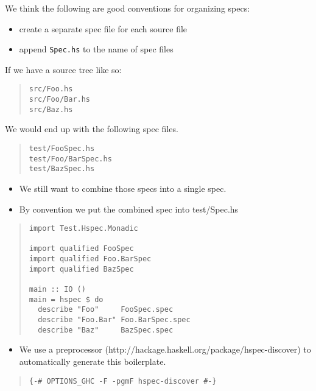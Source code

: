 \documentclass[preprint]{sigplanconf}
\begin{document}
\noindent We think the following are good conventions for organizing specs:
\begin{itemize}
    \item create a separate spec file for each source file
    \item append {\tt Spec.hs} to the name of spec files
\end{itemize}

\noindent If we have a source tree like so:

\begin{quote}
\small
\begin{verbatim}
src/Foo.hs
src/Foo/Bar.hs
src/Baz.hs
\end{verbatim}
\end{quote}

\noindent We would end up with the following spec files.

\begin{quote}
\small
\begin{verbatim}
test/FooSpec.hs
test/Foo/BarSpec.hs
test/BazSpec.hs
\end{verbatim}
\end{quote}

\begin{itemize}
\item We still want to combine those specs into a single spec.
\item By convention we put the combined spec into test/Spec.hs
\end{itemize}

\begin{quote}
\small
\begin{verbatim}
import Test.Hspec.Monadic

import qualified FooSpec
import qualified Foo.BarSpec
import qualified BazSpec

main :: IO ()
main = hspec $ do
  describe "Foo"     FooSpec.spec
  describe "Foo.Bar" Foo.BarSpec.spec
  describe "Baz"     BazSpec.spec
\end{verbatim}
\end{quote}

\begin{itemize}
\item We use a preprocessor (http://hackage.haskell.org/package/hspec-discover) to automatically generate this boilerplate.
\end{itemize}

\begin{quote}
\small
\begin{verbatim}
{-# OPTIONS_GHC -F -pgmF hspec-discover #-}
\end{verbatim}
\end{quote}
\end{document}
